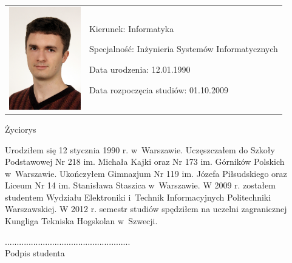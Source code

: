\documentclass[../thesis.tex]{subfiles}
\begin{document}
\begin{flushleft}
\fontsize{12pt}{30pt}\selectfont

\vspace*{6mm}

\begin{tabular}{l l}
  \begin{minipage}{4cm}
    \includegraphics[height=4.5cm]{face.jpg}
  \end{minipage}
  &
  \begin{minipage}{15cm}
    Kierunek: \hspace{15mm} Informatyka

    Specjalność: \hspace{10mm} Inżynieria Systemów Informatycznych

    Data urodzenia: \hspace{51mm} 12.01.1990

    Data rozpoczęcia studiów: \hspace{33mm} 01.10.2009
  \end{minipage}
\end{tabular} 


\vspace{1.5cm}

\begin{center}
Życiorys
\end{center}
Urodziłem się 12 stycznia 1990 r. w~Warszawie. Uczęszczałem do Szkoły Podstawowej Nr 218 im. Michała Kajki oraz Nr 173 im. Górników Polskich w~Warszawie. Ukończyłem Gimnazjum Nr 119 im. Józefa Piłsudskiego oraz Liceum Nr 14 im. Stanisława Staszica w~Warszawie. W 2009 r. zostałem studentem Wydziału Elektroniki i~Technik Informacyjnych Politechniki Warszawskiej. W 2012 r. semestr studiów spędziłem na uczelni zagranicznej Kungliga Tekniska Hogskolan w~Szwecji.
\vspace{1cm}

\fontsize{12pt}{14pt}\selectfont
\hspace*{100mm}..................................................... \\
\hspace*{115mm}Podpis studenta
\vspace*{1cm}


\end{flushleft}
\end{document}
